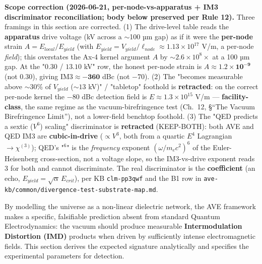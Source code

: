 \noindent\textbf{Scope correction (2026-06-21, per-node-vs-apparatus + IM3 discriminator reconciliation; body below preserved per Rule 12).} Three framings in this section are corrected. (1) The drive-level table reads the \textbf{apparatus} drive voltage (kV across a $\sim$100 µm gap) as if it were the \textbf{per-node} strain $A = E_{local}/E_{yield}$ (with $E_{yield} = V_{yield}/\ell_{node} \approx 1.13\times10^{17}$ V/m, a per-node \emph{field}); this overstates the Ax-4 kernel argument $A$ by $\sim 2.6\times10^8\times$ at a 100 µm gap. At the "$0.30$ / $13.10$ kV" row, the honest per-node strain is $A \approx \mathbf{1.2\times10^{-9}}$ (not $0.30$), giving $\text{IM3} \approx \mathbf{-360}$ dBc (not $-70$). (2) The "becomes measurable above $\sim 30\%$ of $V_{yield}$ ($\sim 13$ kV)" / "tabletop" foothold is \textbf{retracted}: on the correct per-node kernel the $-80$ dBc detection field is $E \approx 1.3\times10^{15}$ V/m --- \textbf{facility-class}, the same regime as the vacuum-birefringence test (Ch.~12, \S``The Vacuum Birefringence Limit''), not a lower-field benchtop foothold. (3) The "QED predicts a sextic ($V^6$) scaling" discriminator is \textbf{retracted} (KEEP-BOTH): both AVE and QED IM3 are \textbf{cubic-in-drive} ($\propto V^3$, both from a quartic $E^4$ Lagrangian $\to \chi^{(3)}$); QED's "$^6$" is the \emph{frequency} exponent $(\omega/m_ec^2)^6$ of the Euler-Heisenberg cross-section, not a voltage slope, so the IM3-vs-drive exponent reads $3$ for both and cannot discriminate. The real discriminator is the \textbf{coefficient} (an echo, $E_{yield} = \sqrt{\alpha}\,E_{crit}$), per KB \texttt{clm-pp3qwf} and the B1 row in \texttt{ave-kb/common/divergence-test-substrate-map.md}.

By modelling the universe as a non-linear dielectric network, the AVE framework makes a specific, falsifiable prediction absent from standard Quantum Electrodynamics: the vacuum should produce measurable \textbf{Intermodulation Distortion (IMD)} products when driven by sufficiently intense electromagnetic fields. This section derives the expected signature analytically and specifies the experimental parameters for detection.

